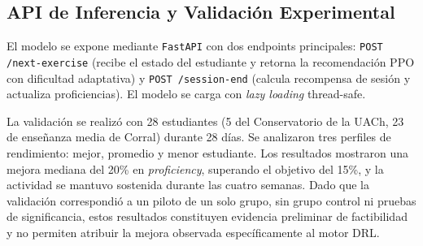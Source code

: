\subsection{API de Inferencia y Validación Experimental}

El modelo se expone mediante \texttt{FastAPI} con dos endpoints principales: \texttt{POST /next-exercise} (recibe el estado del estudiante y retorna la recomendación PPO con dificultad adaptativa) y \texttt{POST /session-end} (calcula recompensa de sesión y actualiza proficiencias). El modelo se carga con \textit{lazy loading} thread-safe.

La validación se realizó con 28 estudiantes (5 del Conservatorio de la UACh, 23 de enseñanza media de Corral) durante 28 días. Se analizaron tres perfiles de rendimiento: mejor, promedio y menor estudiante. Los resultados mostraron una mejora mediana del 20\% en \textit{proficiency}, superando el objetivo del 15\%, y la actividad se mantuvo sostenida durante las cuatro semanas. Dado que la validación correspondió a un piloto de un solo grupo, sin grupo control ni pruebas de significancia, estos resultados constituyen evidencia preliminar de factibilidad y no permiten atribuir la mejora observada específicamente al motor DRL.